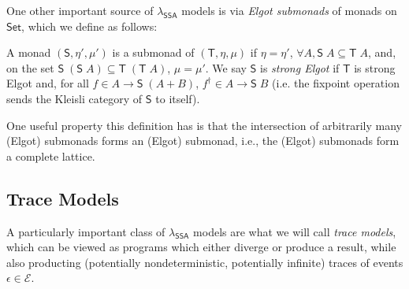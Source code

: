 \documentclass[acmsmall,screen,review]{acmart}
\newcommand{\mc}[1]{\ensuremath{\mathcal{#1}}}
\newcommand{\ms}[1]{\ensuremath{\mathsf{#1}}}
\newcommand{\isotopessa}{\(\lambda_{\ms{SSA}}\)}
\begin{document}
One other important source of \isotopessa{} models is via \emph{Elgot submonads}
of monads on \ms{Set}, which we define as follows:
\begin{definition}
  A monad $(\ms{S}, \eta', \mu')$ is a submonad of $(\ms{T}, \eta, \mu)$ if
  $\eta = \eta'$, $\forall A, \ms{S}\;A \subseteq \ms{T}\;A$, and, on the set
  $\ms{S}\;(\ms{S}\;A) \subseteq \ms{T}\;(\ms{T}\;A)$, $\mu = \mu'$. We say
  $\ms{S}$ is \emph{strong Elgot} if $\ms{T}$ is strong Elgot and, for all $f
  \in A \to \ms{S}\;(A + B)$, $f^\dagger \in A \to \ms{S}\;B$ (i.e. the fixpoint
  operation sends the Kleisli category of $\ms{S}$ to itself).
\end{definition}
One useful property this definition has is that the intersection of arbitrarily many (Elgot)
submonads forms an (Elgot) submonad, i.e., the (Elgot) submonads form a complete lattice.

\subsection{Trace Models}

A particularly important class of \isotopessa{} models are what we will call
\emph{trace models}, which can be viewed as programs which either diverge or
produce a result, while also producting (potentially nondeterministic,
potentially infinite) traces of events $\epsilon \in \mc{E}$.
\end{document}
